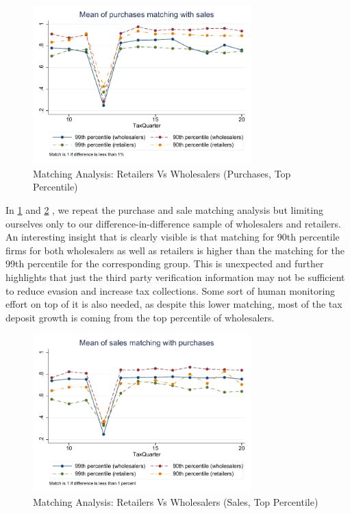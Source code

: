 \begin{figure}[t!] 
\centering
\includegraphics[width=0.75\textwidth]{graphs/AvgMatch_trend_DiffLessThan1percent.pdf}
\caption{Matching Analysis: Retailers Vs Wholesalers (Purchases, Top Percentile)}
\label{fig:matching_retailerswholesalers}
\end{figure}

In \cref{fig:matching_retailerswholesalers} and \cref{fig:matching_retailerswholesalers_sales} , we repeat the purchase and sale matching analysis but limiting ourselves only to our difference-in-difference sample of wholesalers and retailers. An interesting insight that is clearly visible is that matching for 90th percentile firms for both wholesalers as well as retailers is higher than the matching for the 99th percentile for the corresponding group. This is unexpected and further highlights that just the third party verification information may not be sufficient to reduce evasion and increase tax collections. Some sort of human monitoring effort on top of it is also needed, as despite this lower matching, most of the tax deposit growth is coming from the top percentile of wholesalers.

\begin{figure}[t!] 
\centering
\includegraphics[width=0.75\textwidth]{graphs/SalesAvgMatch_trend_DiffLessThan1percent.pdf}
\caption{Matching Analysis: Retailers Vs Wholesalers (Sales, Top Percentile)}
\label{fig:matching_retailerswholesalers_sales}
\end{figure}

